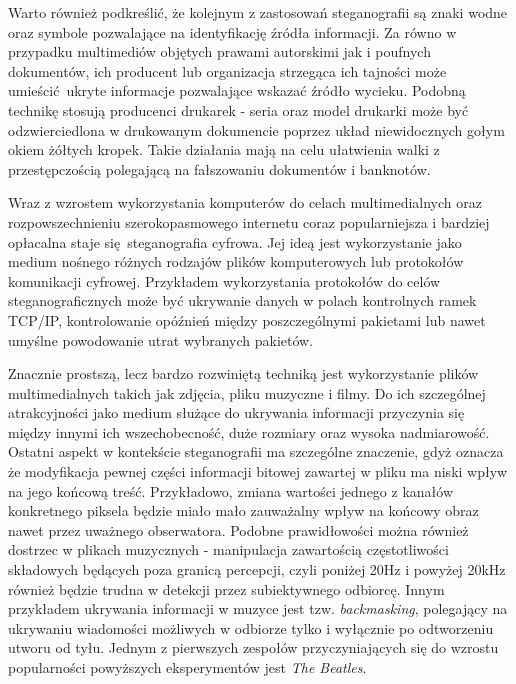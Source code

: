 {    %
    Warto również podkreślić, że kolejnym z zastosowań steganografii są znaki wodne oraz symbole
    pozwalające na identyfikację źródła informacji. Za równo w przypadku multimediów objętych prawami autorskimi
    jak i poufnych dokumentów, ich producent lub organizacja strzegąca ich tajności może umieścić ukryte
    informacje pozwalające wskazać źródło wycieku.
    Podobną technikę stosują producenci drukarek - seria oraz model drukarki może być odzwierciedlona w drukowanym
    dokumencie poprzez układ niewidocznych gołym okiem żółtych kropek. Takie działania mają na celu ułatwienia
    walki z przestępczością polegającą na fałszowaniu dokumentów i banknotów.

    Wraz z wzrostem wykorzystania komputerów do celach multimedialnych oraz rozpowszechnieniu szerokopasmowego
    internetu coraz popularniejsza i bardziej opłacalna staje się steganografia cyfrowa.
    Jej ideą jest wykorzystanie jako medium nośnego różnych rodzajów plików komputerowych
    lub protokołów komunikacji cyfrowej.
    Przykładem wykorzystania protokołów do celów steganograficznych może być ukrywanie danych w polach kontrolnych ramek TCP/IP,
    kontrolowanie opóźnień między poszczególnymi pakietami lub nawet umyślne powodowanie utrat wybranych pakietów.

    Znacznie prostszą, lecz bardzo rozwiniętą techniką jest wykorzystanie plików multimedialnych takich jak zdjęcia,
    pliku muzyczne i filmy. Do ich szczególnej atrakcyjności jako medium służące do ukrywania informacji przyczynia
    się między innymi ich wszechobecność, duże rozmiary oraz wysoka nadmiarowość.
    Ostatni aspekt w kontekście steganografii ma szczególne znaczenie, gdyż oznacza że modyfikacja pewnej części informacji
    bitowej zawartej w pliku ma niski wpływ na jego końcową treść. Przykładowo, zmiana wartości jednego z kanałów konkretnego
    piksela będzie miało mało zauważalny wpływ na końcowy obraz nawet przez uważnego obserwatora.
    Podobne prawidłowości można również dostrzec w plikach muzycznych - manipulacja zawartością częstotliwości składowych
    będących poza granicą percepcji, czyli poniżej 20Hz i powyżej 20kHz również będzie trudna w detekcji przez subiektywnego odbiorcę.
    Innym przykładem ukrywania informacji w muzyce jest tzw. \textit{backmasking}, polegający na ukrywaniu wiadomości
    możliwych w odbiorze tylko i wyłącznie po odtworzeniu utworu od tyłu. Jednym z pierwszych zespołów przyczyniających się
    do wzrostu popularności powyższych eksperymentów jest \textit{The Beatles}.
 
}
